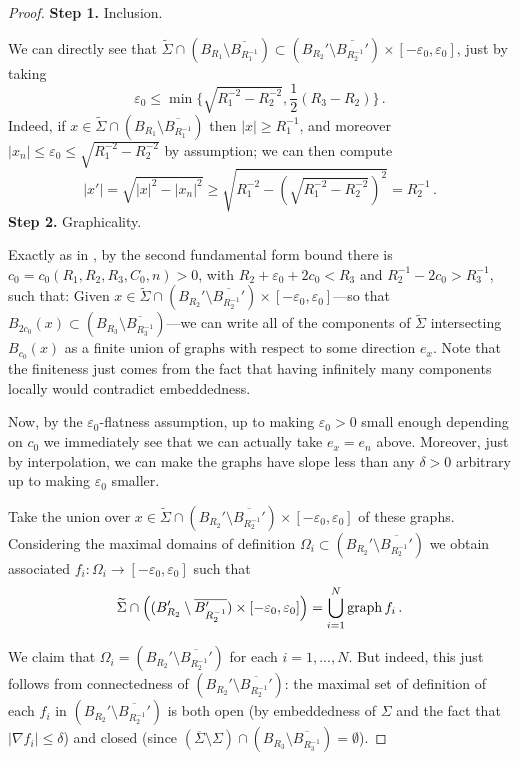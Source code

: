 \documentclass{article}
\newcommand{\ep}{\varepsilon}
\theoremstyle{definition}
\begin{document}
\begin{proof}
{\bf Step 1.} Inclusion.
    
We can directly see that $\widetilde\Sigma \cap (B_{R_1}\setminus \overline{B_{R_1^{-1}}})\subset (B_{R_2}'\setminus \overline{B_{R_2^{-1}}'})\times [-\ep_0,\ep_0]$, just by taking
$$\ep_0\leq \min\{\sqrt{R_1^{-2}-R_2^{-2}},\frac{1}{2}(R_3-R_2)\}\,.$$
Indeed, if $x\in \widetilde\Sigma\cap (B_{R_1}\setminus \overline{B_{R_1^{-1}}})$ then $|x|\geq R_1^{-1}$, and moreover $|x_n|\leq \ep_0\leq \sqrt{R_1^{-2}-R_2^{-2}}$ by assumption; we can then compute 
$$|x'|=\sqrt{|x|^2 - |x_n|^2}\geq \sqrt{R_1^{-2}-(\sqrt{R_1^{-2}-R_2^{-2}})^2}=R_2^{-1}\,.$$
{\bf Step 2.} Graphicality.


    Exactly as in , by the second fundamental form bound there is $c_0=c_0(R_1,R_2,R_3,C_0,n)>0$, with $R_2+\ep_0+2c_0< R_3$ and $R_2^{-1}-2c_0> R_3^{-1}$, such that:
    Given $x\in \widetilde\Sigma \cap (B_{R_2}'\setminus \overline{B_{R_2^{-1}}'})\times[-\ep_0,\ep_0]$---so that $B_{2c_0}(x)\subset (B_{R_3}\setminus \overline{B_{R_3^{-1}}})$---we can write all of the components of $\widetilde\Sigma$ intersecting $B_{c_0}(x)$ as a finite union of graphs with respect to some direction $e_x$. Note that the finiteness just comes from the fact that having infinitely many components locally would contradict embeddedness.
    
    Now, by the $\ep_0$-flatness assumption, up to making $\ep_0>0$ small enough depending on $c_0$ we immediately see that we can actually take $e_x=e_n$ above. Moreover, just by interpolation, we can make the graphs have slope less than any $\delta>0$ arbitrary up to making $\ep_0$ smaller.
    
    Take the union over $x\in \widetilde\Sigma \cap (B_{R_2}'\setminus \overline{B_{R_2^{-1}}'})\times[-\ep_0,\ep_0]$ of these graphs. Considering the maximal domains of definition $\Omega_i\subset (B_{R_2}'\setminus \overline{B_{R_2^{-1}}'})$ we obtain associated $f_i:\Omega_i\to [-\ep_0,\ep_0]$ such that
    $$\widetilde\Sigma\cap \left((B_{R_2}'\setminus \overline{B_{R_2^{-1}}'})\times[-\ep_0,\ep_0]\right)=\bigcup_{i=1}^{N}{\rm graph}\,f_i\,.$$
    
    We claim that $\Omega_i=(B_{R_2}'\setminus \overline{B_{R_2^{-1}}'})$ for each $i=1,...,N$. But indeed, this just follows from connectedness of $(B_{R_2}'\setminus \overline{B_{R_2^{-1}}'})$: the maximal set of definition of each $f_i$ in $(B_{R_2}'\setminus \overline{B_{R_2^{-1}}'})$ is both open (by embeddedness of $\Sigma$ and the fact that $|\nabla f_i|\leq \delta$) and closed (since $(\overline\Sigma\setminus \Sigma)\cap (B_{R_3}\setminus \overline{B_{R_3^{-1}}})=\emptyset$).
\end{proof}
\end{document}
